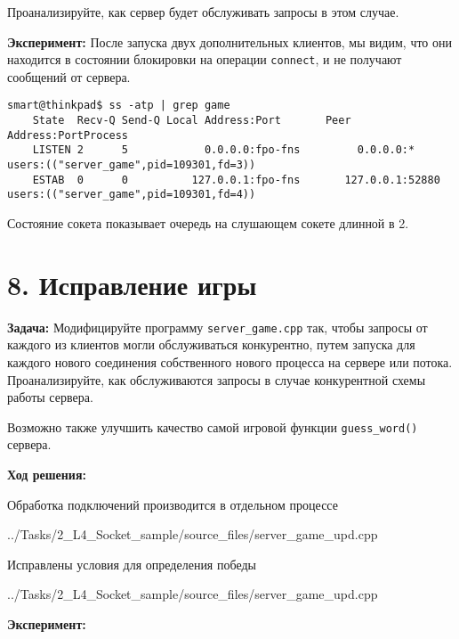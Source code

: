 Проанализируйте, как сервер будет обслуживать запросы в этом случае.

\textbf{Эксперимент:} После запуска двух дополнительных клиентов, мы видим, что они находится в состоянии блокировки на операции \texttt{connect}, и не получают сообщений от сервера.

\begin{Verbatim}[frame=single]
    smart@thinkpad$ ss -atp | grep game
    State  Recv-Q Send-Q Local Address:Port       Peer Address:PortProcess
    LISTEN 2      5            0.0.0.0:fpo-fns         0.0.0.0:*         users:(("server_game",pid=109301,fd=3))
    ESTAB  0      0          127.0.0.1:fpo-fns       127.0.0.1:52880     users:(("server_game",pid=109301,fd=4))
\end{Verbatim}
Состояние сокета показывает очередь на слушающем сокете длинной в 2.

\section*{8. Исправление игры}
\textbf{Задача:} Модифицируйте программу \texttt{server\_game.cpp} так, чтобы запросы от каждого из клиентов могли обслуживаться конкурентно, путем запуска для каждого нового соединения собственного нового процесса на сервере или потока. Проанализируйте, как обслуживаются запросы в случае конкурентной схемы работы сервера.

Возможно также улучшить качество самой игровой функции \texttt{guess\_word()} сервера.

\textbf{Ход решения:}

Обработка подключений производится в отдельном процессе

{../Tasks/2_L4_Socket_sample/source_files/server_game_upd.cpp}

Исправлены условия для определения победы

{../Tasks/2_L4_Socket_sample/source_files/server_game_upd.cpp}

\textbf{Эксперимент:}

